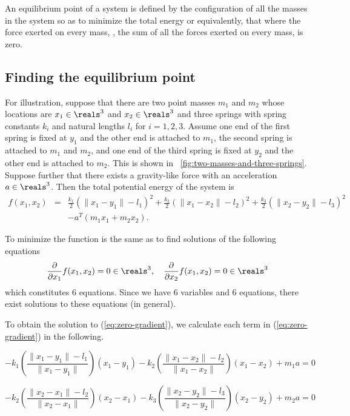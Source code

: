 \documentclass{article}
\begin{document}
An equilibrium point of a system
is defined by the configuration of all the masses in the system
so as to minimize the total energy
or equivalently,
that where the force exerted on every mass, \ie, the sum of all the forces exerted on every mass,
is zero.


\subsection{Finding the equilibrium point}

For illustration,
suppose that there are two point masses
$m_1$ and $m_2$ whose locations are $x_1\in\reals^3$ and $x_2\in\reals^3$
and three springs with spring constants $k_i$ and natural lengths $l_i$ for $i=1,2,3$.
Assume one end of the first spring is fixed at $y_1$ and the other end is attached to $m_1$,
the second spring is attached to $m_1$ and $m_2$,
and one end of the third spring is fixed at $y_2$ and the other end is attached to $m_2$.
This is shown in \figurename~\ref{fig:two-masses-and-three-springs}.
Suppose further that there exists a gravity-like force with an acceleration $a\in\reals^3$.
Then the total potential energy of the system is
\begin{eqnarray}
\nonumber
f(x_1,x_2)&=&
\frac{k_1}{2} (\|x_1-y_1\|-l_1)^2
+\frac{k_2}{2} (\|x_1-x_2\|-l_2)^2
+\frac{k_3}{2} (\|x_2-y_2\|-l_3)^2
\\
\label{eq:sum-of-potential-energies}
&&
-a^T(m_1x_1+m_2x_2).
\end{eqnarray}

To minimize the function
is the same as to find solutions of
the following equations
\begin{equation}
\label{eq:zero-gradient}
\frac{\partial}{\partial x_1} f(x_1,x_2) = 0 \in\reals^3,
\quad
\frac{\partial}{\partial x_2} f(x_1,x_2) = 0 \in\reals^3
\end{equation}
which constitutes $6$ equations.
Since we have $6$ variables and $6$ equations,
there exist solutions to these equations (in general).

To obtain the solution to (\ref{eq:zero-gradient}),
we calculate each term in (\ref{eq:zero-gradient}) in the following.

\begin{equation}
\label{eq:force:1}
-k_1\left(\frac{\|x_1-y_1\| -l_1}{\|x_1-y_1\|}\right) (x_1-y_1)
-k_2\left(\frac{\|x_1-x_2\| -l_2}{\|x_1-x_2\|}\right) (x_1-x_2)
+ m_1 a
= 0
\end{equation}

\begin{equation}
\label{eq:force:2}
-k_2\left(\frac{\|x_2-x_1\| -l_2}{\|x_2-x_1\|}\right) (x_2-x_1)
-k_3\left(\frac{\|x_2-y_2\| -l_3}{\|x_2-y_2\|}\right) (x_2-y_2)
+ m_2 a
= 0
\end{equation}
\end{document}
